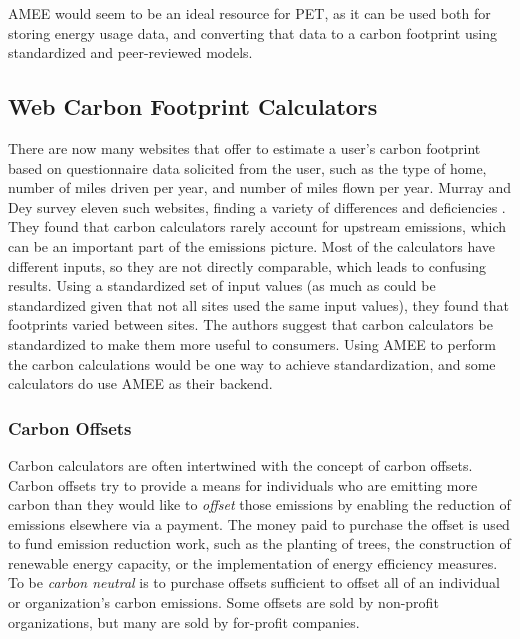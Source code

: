 AMEE would seem to be an ideal resource for PET, as it can be used both for storing energy usage data, and converting that data to a carbon footprint using standardized and peer-reviewed models.

\subsection{Web Carbon Footprint Calculators}
\label{carbon-calculators}

There are now many websites that offer to estimate a user's carbon footprint based on questionnaire data solicited from the user, such as the type of home, number of miles driven per year, and number of miles flown per year. Murray and Dey survey eleven such websites, finding a variety of differences and deficiencies \cite{Murray2007Carbon-neutral}. They found that carbon calculators rarely account for upstream emissions, which can be an important part of the emissions picture. Most of the calculators have different inputs, so they are not directly comparable, which leads to confusing results. Using a standardized set of input values (as much as could be standardized given that not all sites used the same input values), they found that footprints varied between sites. The authors suggest that carbon calculators be standardized to make them more useful to consumers. Using AMEE to perform the carbon calculations would be one way to achieve standardization, and some calculators do use AMEE as their backend.

\subsubsection{Carbon Offsets}

Carbon calculators are often intertwined with the concept of carbon offsets. Carbon offsets try to provide a means for individuals who are emitting more carbon than they would like to \emph{offset} those emissions by enabling the reduction of emissions elsewhere via a payment. The money paid to purchase the offset is used to fund emission reduction work, such as the planting of trees, the construction of renewable energy capacity, or the implementation of energy efficiency measures. To be \emph{carbon neutral} is to purchase offsets sufficient to offset all of an individual or organization's carbon emissions. Some offsets are sold by non-profit organizations, but many are sold by for-profit companies.


